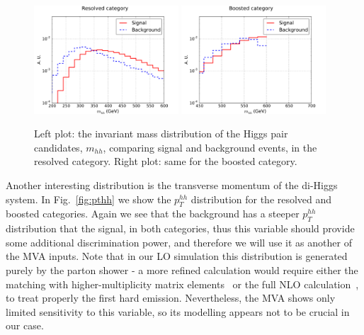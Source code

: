 \begin{figure}[t]
\begin{center}
  \includegraphics[width=0.48\textwidth]{plots/m_HH_res_C1.pdf}
  \includegraphics[width=0.48\textwidth]{plots/m_HH_boost_C1.pdf}
  \caption{\small Left plot: the invariant mass distribution of the Higgs
    pair candidates, $m_{hh}$, comparing signal and background events,
    in the resolved category.
    Right plot: same for the boosted category.
}
\label{fig:mhh}
\end{center}
\end{figure}


Another interesting distribution is the transverse momentum of
the di-Higgs system.
%
In Fig.~\ref{fig:pthh} we show the $p_T^{hh}$
distribution
for the resolved and boosted categories.
%
Again we see that the background has a steeper $p_T^{hh}$ distribution
that the signal, in both categories, thus this variable
should provide some additional discrimination power, and therefore
we will use it as another of the MVA inputs.
%
Note that in our LO simulation this distribution is generated purely
by the parton shower - a more refined calculation would require
either the matching with higher-multiplicity matrix elements~\cite{Maierhofer:2013sha} or
the full NLO calculation~\cite{Frederix:2014hta}, to treat properly the first hard emission.
%
Nevertheless, the MVA shows only limited sensitivity to this variable, so its
modelling appears not to be crucial in our case.


